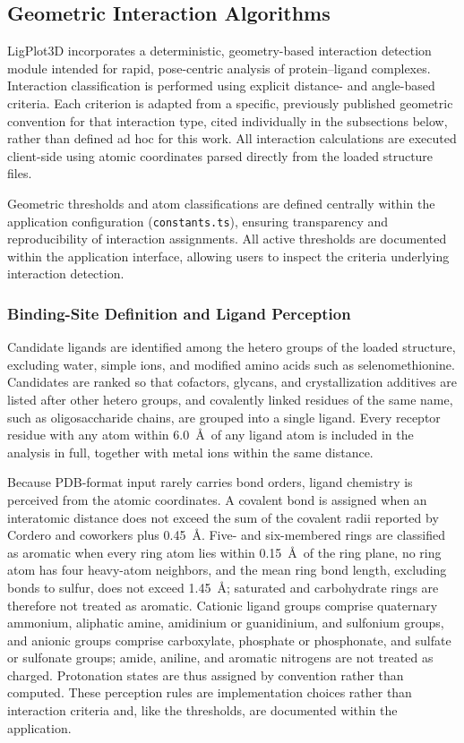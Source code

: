 \documentclass[journal=jacsat,manuscript=article]{achemso}
\begin{document}
\subsection{Geometric Interaction Algorithms}
LigPlot3D incorporates a deterministic, geometry-based interaction detection module intended for rapid, pose-centric analysis of protein--ligand complexes. Interaction classification is performed using explicit distance- and angle-based criteria. Each criterion is adapted from a specific, previously published geometric convention for that interaction type, cited individually in the subsections below, rather than defined ad hoc for this work. All interaction calculations are executed client-side using atomic coordinates parsed directly from the loaded structure files.

Geometric thresholds and atom classifications are defined centrally within the application configuration (\texttt{constants.ts}), ensuring transparency and reproducibility of interaction assignments. All active thresholds are documented within the application interface, allowing users to inspect the criteria underlying interaction detection.

\subsubsection{Binding-Site Definition and Ligand Perception}
Candidate ligands are identified among the hetero groups of the loaded structure, excluding water, simple ions, and modified amino acids such as selenomethionine. Candidates are ranked so that cofactors, glycans, and crystallization additives are listed after other hetero groups, and covalently linked residues of the same name, such as oligosaccharide chains, are grouped into a single ligand. Every receptor residue with any atom within 6.0~\AA\ of any ligand atom is included in the analysis in full, together with metal ions within the same distance.

Because PDB-format input rarely carries bond orders, ligand chemistry is perceived from the atomic coordinates. A covalent bond is assigned when an interatomic distance does not exceed the sum of the covalent radii reported by Cordero and coworkers \cite{cordero2008covalent} plus 0.45~\AA. Five- and six-membered rings are classified as aromatic when every ring atom lies within 0.15~\AA\ of the ring plane, no ring atom has four heavy-atom neighbors, and the mean ring bond length, excluding bonds to sulfur, does not exceed 1.45~\AA; saturated and carbohydrate rings are therefore not treated as aromatic. Cationic ligand groups comprise quaternary ammonium, aliphatic amine, amidinium or guanidinium, and sulfonium groups, and anionic groups comprise carboxylate, phosphate or phosphonate, and sulfate or sulfonate groups; amide, aniline, and aromatic nitrogens are not treated as charged. Protonation states are thus assigned by convention rather than computed. These perception rules are implementation choices rather than interaction criteria and, like the thresholds, are documented within the application.
\end{document}
